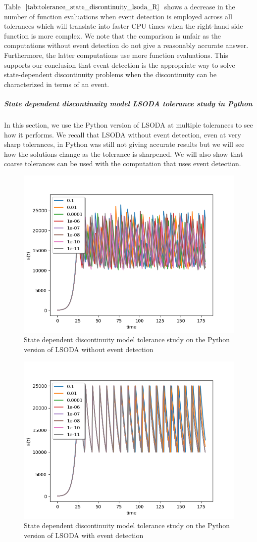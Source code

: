 Table $\ref{tab:tolerance_state_discontinuity_lsoda_R}$ shows a decrease in the number of function evaluations when event detection is employed across all tolerances which will translate into faster CPU times when the right-hand side function is more complex. We note that the comparison is unfair as the computations without event detection do not give a reasonably accurate answer. Furthermore, the latter computations use more function evaluations. This supports our conclusion that event detection is the appropriate way to solve state-dependent discontinuity problems when the discontinuity can be characterized in terms of an event.

\subparagraph{State dependent discontinuity model LSODA tolerance study in Python}
In this section, we use the Python version of LSODA at multiple tolerances to see how it performs. We recall that LSODA without event detection, even at very sharp tolerances, in Python was still not giving accurate results but we will see how the solutions change as the tolerance is sharpened. We will also show that coarse tolerances can be used with the computation that uses event detection. 

\begin{figure}[h]
\centering
\includegraphics[width=0.7\linewidth]{./figures/tolerance_state_lsoda_no_event_py}
\caption{State dependent discontinuity model tolerance study on the Python version of LSODA without event detection}
\label{fig:tolerance_state_lsoda_no_event_py}
\end{figure}

\begin{figure}[h]
\centering
\includegraphics[width=0.7\linewidth]{./figures/tolerance_state_lsoda_with_event_py}
\caption{State dependent discontinuity model tolerance study on the Python version of LSODA with event detection}
\label{fig:tolerance_state_lsoda_with_event_py}
\end{figure}

